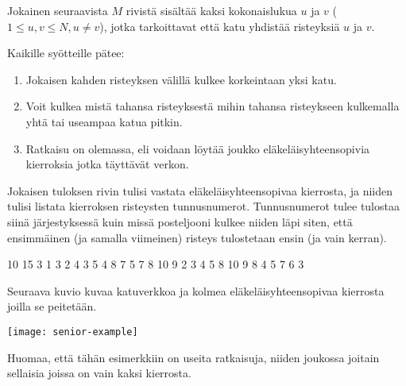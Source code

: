 \documentclass{boi2014-fi}
\begin{document}
    Jokainen seuraavista $M$ rivistä sisältää kaksi kokonaislukua $u$ ja $v$
    ($1 \le u, v \le N, u \neq v$), jotka tarkoittavat että katu yhdistää
    risteyksiä $u$ ja $v$.

    Kaikille syötteille pätee:
    \begin{enumerate}
        \item Jokaisen kahden risteyksen välillä kulkee korkeintaan yksi katu.
        \item Voit kulkea mistä tahansa risteyksestä mihin tahansa risteykseen
            kulkemalla yhtä tai useampaa katua pitkin.
        \item Ratkaisu on olemassa, eli voidaan löytää joukko eläkeläisyhteensopivia
            kierroksia jotka täyttävät verkon.
    \end{enumerate}
    
    \Output
    Jokaisen tuloksen rivin tulisi vastata eläkeläisyhteensopivaa kierrosta, ja
    niiden tulisi listata kierroksen risteysten tunnusnumerot. Tunnusnumerot
    tulee tulostaa siinä järjestyksessä kuin missä posteljooni kulkee niiden
    läpi siten, että ensimmäinen (ja samalla viimeinen) risteys tulostetaan ensin
    (ja vain kerran).

    

    \Example

    \example
    {
        10 15  3  1 3  2 4  3 5  4 8  7  5 7  8  10  9
    }
    {
        2 3 4 5 8 10 9  8 4  5 7 6 3
    }
    {
        Seuraava kuvio kuvaa katuverkkoa ja kolmea eläkeläisyhteensopivaa
        kierrosta joilla se peitetään.

        \texttt{[image: senior-example]}

        Huomaa, että tähän esimerkkiin on useita ratkaisuja, niiden joukossa
        joitain sellaisia joissa on vain kaksi kierrosta.
    }
\end{document}
